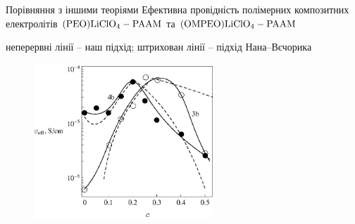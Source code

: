\documentclass[10pt]{beamer}
\begin{document}
{
\begin{frame}{Порівняння з іншими теоріями}
Ефективна провідність полімерних композитних електролітів $\rm (PEO)LiClO_4-PAAM$ та $\rm (OMPEO)LiClO_4-PAAM$

\footnotesize
неперервні лінії -- наш підхід; 
штрихован лінії -- підхід Нана--Вєчорика


      \begin{figure}
        \centering
        \includegraphics[width=0.6\textwidth]{images/Fig5_Comparison.eps}
      \end{figure}

\end{frame}
}
\end{document}
